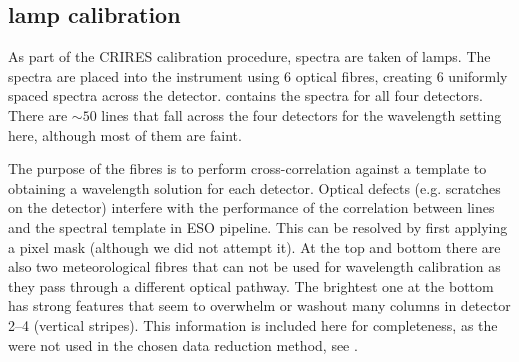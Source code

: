 \subsection{\thar{} lamp calibration}
\label{subsec:th-ar}
As part of the {CRIRES} calibration procedure, spectra are taken of \thar{} lamps. The \thar{} spectra are placed into the instrument using 6 optical fibres, creating 6 uniformly spaced spectra across the detector.
 contains the \thar{} spectra for all four detectors. There are \(\sim50\) \thar{} lines that fall across the four detectors for the wavelength setting here, although most of them are faint.

The purpose of the \thar{} fibres is to perform cross-correlation against a \thar{} template to obtaining a wavelength solution for each detector. Optical defects (e.g. scratches on the detector) interfere with the performance of the correlation between \thar{} lines and the spectral template in {ESO} pipeline. This can be resolved by first applying a pixel mask (although we did not attempt it). At the top and bottom there are also two meteorological fibres that can not be used for wavelength calibration as they pass through a different optical pathway. The brightest one at the bottom has strong features that seem to overwhelm or washout many columns in detector 2--4 (vertical stripes). 
This information is included here for completeness, as the \thar{} were not used in the chosen data reduction method, see .


